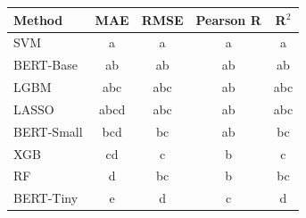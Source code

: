 \begin{tabular}{lcccc}
\toprule
Method & MAE & RMSE & Pearson R & R$^2$ \\
\midrule
SVM & a & a & a & a \\
BERT-Base & ab & ab & ab & ab \\
LGBM & abc & abc & ab & abc \\
LASSO & abcd & abc & ab & abc \\
BERT-Small & bcd & bc & ab & bc \\
XGB & cd & c & b & c \\
RF & d & bc & b & bc \\
BERT-Tiny & e & d & c & d \\
\bottomrule
\end{tabular}
